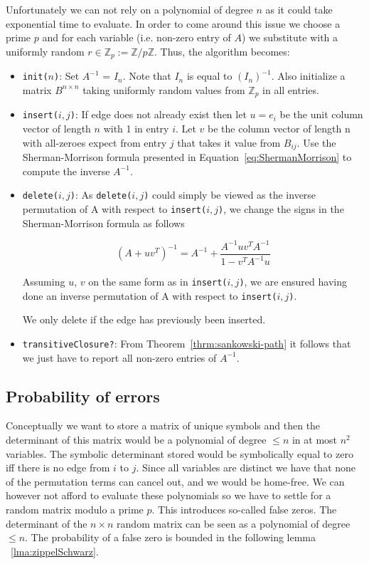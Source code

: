\documentclass[a4paper,oneside,article,11pt]{memoir}
\begin{document}
Unfortunately we can not rely on a polynomial of degree $n$ as it could take exponential time to evaluate. In order to come around this issue we choose a prime $p$ and for each variable (i.e. non-zero entry of $A$) we substitute with a uniformly random $r \in \mathbb{Z}_{p} := \mathbb{Z} / p\mathbb{Z}$. Thus, the algorithm becomes:

\begin{itemize}
\item{\texttt{init($n$)}: Set $A^{-1}$ = $I_n$. Note that $I_n$ is equal to $(I_n)^{-1}$. Also  initialize a matrix $B^{n \times n}$ taking uniformly random values from $\mathbb{Z}_p$ in all entries.}
\item{\texttt{insert($i,j$)}: If edge does not already exist then let $u = e_i$ be the unit column vector of length $n$ with 1 in entry $i$. Let $v$ be the column vector of length n with all-zeroes expect from entry $j$ that takes it value from $B_{ij}$.
Use the Sherman-Morrison formula presented in Equation~\ref{eq:ShermanMorrison} to compute the inverse $A^{-1}$.}
\item{\texttt{delete($i,j$)}: As \texttt{delete($i,j$)} could simply be viewed as the inverse permutation of A with respect to \texttt{insert($i,j$)}, we change the signs in the Sherman-Morrison formula as follows

$$(A+uv^T)^{-1} = A^{-1} + \dfrac{A^{-1}uv^TA^{-1}}{1 - v^T A^{-1} u}$$

Assuming $u$, $v$ on the same form as in \texttt{insert($i,j$)}, we are ensured having done an inverse permutation of A with respect to \texttt{insert($i,j$)}.

We only delete if the edge has previously been inserted.
}

\item{\texttt{transitiveClosure?}: From Theorem~\ref{thrm:sankowski-path} it follows that we just have to report all non-zero entries of $A^{-1}$.}
\end{itemize}

\subsection{Probability of errors}

Conceptually we want to store a matrix of unique symbols and then the determinant of this matrix would be a polynomial of degree $\leq n$ in at most $n^2$ variables. The symbolic determinant stored would be symbolically equal to zero iff there is no edge from $i$ to $j$. Since all variables are distinct we have that none of the permutation terms can cancel out, and we would be home-free. We can however not afford to evaluate these polynomials so we have to settle for a random matrix modulo a prime $p$.
This introduces so-called false zeros. The determinant of the $n \times n$ random matrix can be seen as a polynomial of degree $\leq n$. The probability of a false zero is bounded in the following lemma ~\ref{lma:zippelSchwarz}.
\end{document}

